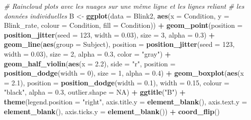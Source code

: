\documentclass[
  french,
]{book}
\newenvironment{Shaded}{\begin{snugshade}}{\end{snugshade}}
\newcommand{\CommentTok}[1]{\textcolor[rgb]{0.56,0.35,0.01}{\textit{#1}}}
\newcommand{\DataTypeTok}[1]{\textcolor[rgb]{0.13,0.29,0.53}{#1}}
\newcommand{\DecValTok}[1]{\textcolor[rgb]{0.00,0.00,0.81}{#1}}
\newcommand{\FloatTok}[1]{\textcolor[rgb]{0.00,0.00,0.81}{#1}}
\newcommand{\KeywordTok}[1]{\textcolor[rgb]{0.13,0.29,0.53}{\textbf{#1}}}
\newcommand{\NormalTok}[1]{#1}
\newcommand{\OperatorTok}[1]{\textcolor[rgb]{0.81,0.36,0.00}{\textbf{#1}}}
\newcommand{\OtherTok}[1]{\textcolor[rgb]{0.56,0.35,0.01}{#1}}
\newcommand{\StringTok}[1]{\textcolor[rgb]{0.31,0.60,0.02}{#1}}
\begin{document}
\begin{Shaded}
\begin{Highlighting}[]
\CommentTok{# Raincloud plots avec les nuages sur une même ligne et les lignes reliant }
\CommentTok{# les données individuelles}
\NormalTok{B <-}
\StringTok{  }\KeywordTok{ggplot}\NormalTok{(}\DataTypeTok{data =}\NormalTok{ Blink2, }\KeywordTok{aes}\NormalTok{(}\DataTypeTok{x =}\NormalTok{ Condition, }\DataTypeTok{y =}\NormalTok{ Blink_rate, }
                            \DataTypeTok{colour =}\NormalTok{ Condition, }\DataTypeTok{fill =}\NormalTok{ Condition)) }\OperatorTok{+}
\StringTok{  }\KeywordTok{geom_point}\NormalTok{(}\DataTypeTok{position =} \KeywordTok{position_jitter}\NormalTok{(}\DataTypeTok{seed =} \DecValTok{123}\NormalTok{, }\DataTypeTok{width =} \FloatTok{0.03}\NormalTok{),}
             \DataTypeTok{size =} \DecValTok{3}\NormalTok{, }\DataTypeTok{alpha =} \FloatTok{0.3}\NormalTok{) }\OperatorTok{+}\StringTok{ }
\StringTok{  }\KeywordTok{geom_line}\NormalTok{(}\KeywordTok{aes}\NormalTok{(}\DataTypeTok{group =}\NormalTok{ Subject),}
            \DataTypeTok{position =} \KeywordTok{position_jitter}\NormalTok{(}\DataTypeTok{seed =} \DecValTok{123}\NormalTok{, }\DataTypeTok{width =} \FloatTok{0.03}\NormalTok{),}
            \DataTypeTok{size =} \DecValTok{2}\NormalTok{, }\DataTypeTok{alpha =} \FloatTok{0.3}\NormalTok{, }\DataTypeTok{color =} \StringTok{"gray"}\NormalTok{) }\OperatorTok{+}\StringTok{ }
\StringTok{  }\KeywordTok{geom_half_violin}\NormalTok{(}\KeywordTok{aes}\NormalTok{(}\DataTypeTok{x =} \FloatTok{2.2}\NormalTok{),}
                   \DataTypeTok{side =} \StringTok{"r"}\NormalTok{,}
                   \DataTypeTok{position =} \KeywordTok{position_dodge}\NormalTok{(}\DataTypeTok{width =} \DecValTok{0}\NormalTok{),}
                   \DataTypeTok{size =} \DecValTok{1}\NormalTok{, }\DataTypeTok{alpha =} \FloatTok{0.4}\NormalTok{) }\OperatorTok{+}\StringTok{  }
\StringTok{  }\KeywordTok{geom_boxplot}\NormalTok{(}\KeywordTok{aes}\NormalTok{(}\DataTypeTok{x =} \FloatTok{2.1}\NormalTok{),}
               \DataTypeTok{position =} \KeywordTok{position_dodge}\NormalTok{(}\DataTypeTok{width =} \FloatTok{0.1}\NormalTok{),}
               \DataTypeTok{width =} \FloatTok{0.15}\NormalTok{, }\DataTypeTok{colour =} \StringTok{"black"}\NormalTok{, }\DataTypeTok{alpha =} \FloatTok{0.3}\NormalTok{, }
               \DataTypeTok{outlier.shape =} \OtherTok{NA}\NormalTok{) }\OperatorTok{+}
\StringTok{  }\KeywordTok{ggtitle}\NormalTok{(}\StringTok{"B"}\NormalTok{) }\OperatorTok{+}
\StringTok{  }\KeywordTok{theme}\NormalTok{(}\DataTypeTok{legend.position =} \StringTok{"right"}\NormalTok{,}
        \DataTypeTok{axis.title.y =} \KeywordTok{element_blank}\NormalTok{(),}
        \DataTypeTok{axis.text.y =} \KeywordTok{element_blank}\NormalTok{(),}
        \DataTypeTok{axis.ticks.y =} \KeywordTok{element_blank}\NormalTok{()) }\OperatorTok{+}
\StringTok{  }\KeywordTok{coord_flip}\NormalTok{()}
\end{Highlighting}
\end{Shaded}
\end{document}

